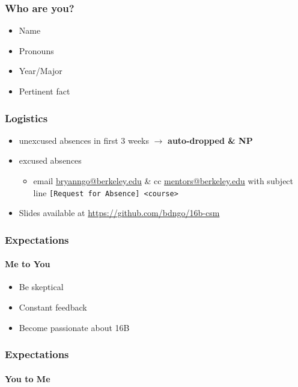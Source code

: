 \documentclass[aspectratio=169]{beamer}
\begin{document}
\begin{frame}
    \frametitle{Who are you?}

    \begin{itemize}
        \item Name
        \item Pronouns
        \item Year/Major
        \item Pertinent fact
    \end{itemize}
\end{frame}

\begin{frame}
    \frametitle{Logistics}

    \begin{itemize}
        \item unexcused absences in first 3 weeks \(\to\) \textbf{auto-dropped \& NP}
        \item excused absences
        \begin{itemize}
            \item email \href{mailto:bryanngo@berkeley.edu}{bryanngo@berkeley.edu} \& cc \href{mailto:mentors@berkeley.edu}{mentors@berkeley.edu} with subject line \texttt{[Request for Absence] <course>}
        \end{itemize}
        \item Slides available at \url{https://github.com/bdngo/16b-csm}
    \end{itemize}
\end{frame}

\begin{frame}
    \frametitle{Expectations}
    \framesubtitle{Me to You}

    \begin{itemize}
        \item Be skeptical
        \item Constant feedback
        \item Become passionate about 16B
    \end{itemize}
\end{frame}

\begin{frame}
    \frametitle{Expectations}
    \framesubtitle{You to Me}

\end{frame}

\end{document}
